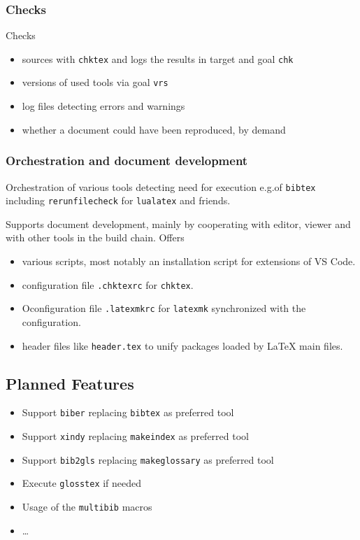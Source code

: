 \documentclass[a4paper,notumble,10pt,english]{leaflet}%
\begin{document}
\subsubsection{Checks}

Checks 
%
\begin{itemize}
  \item
  sources with \texttt{chktex} and logs the results in target and goal \texttt{chk} 
  \item
  versions of used tools via goal \texttt{vrs} 
  \item
  log files detecting errors and warnings 
  \item
  whether a document could have been reproduced, by demand 
\end{itemize}


\subsubsection{Orchestration and document development}

Orchestration of various tools detecting need for execution 
e.g.\@ of \texttt{bibtex} including \texttt{rerunfilecheck} for \texttt{lualatex} and friends.

Supports document development, mainly by cooperating with editor, viewer and with other tools in the build chain. 
Offers 
%
\begin{itemize}
  \item various scripts, 
  most notably an installation script for extensions of VS Code.
  \item configuration file \texttt{.chktexrc} for \texttt{chktex}.
  \item Oconfiguration file \texttt{.latexmkrc} 
  for \texttt{latexmk} synchronized with the configuration.
  \item header files like \texttt{header.tex} 
  to unify packages loaded by \LaTeX{} main files. %
\end{itemize}

\subsection{Planned Features}

\begin{itemize}
  \item Support \texttt{biber} replacing \texttt{bibtex} as preferred tool
  \item Support \texttt{xindy} replacing \texttt{makeindex} as preferred tool
  \item Support \texttt{bib2gls} replacing \texttt{makeglossary} as preferred tool
  \item Execute \texttt{glosstex} if needed
  \item Usage of the \texttt{multibib} macros
  \item \dots
  \end{itemize}
\end{document}
